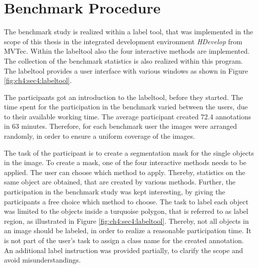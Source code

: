 
\section{Benchmark Procedure}\label{ord:ch4:sec5}
% 
The benchmark study is realized within a label tool, that was implemented in the scope of this thesis in the integrated development environment \textit{HDevelop} from MVTec.
Within the labeltool also the four interactive methods are implemented.
The collection of the benchmark statistics is also realized within this program.
The labeltool provides a user interface with various windows as shown in Figure \ref{fig:ch4:sec4:labeltool}.

The participants got an introduction to the labeltool, before they started.
The time spent for the participation in the benchmark varied between the users, due to their available working time. %
The average participant created 72.4 annotations in 63 minutes.
Therefore, for each benchmark user the images were arranged randomly, in order to ensure a uniform coverage of the images.

The task of the participant is to create a segmentation mask for the single objects in the image.
To create a mask, one of the four interactive methods needs to be applied.
The user can choose which method to apply.
Thereby, statistics on the same object are obtained, that are created by various methods.
Further, the participation in the benchmark study was kept interesting, by giving the participants a free choice which method to choose.
The task to label each object was limited to the objects inside a turquoise polygon, that is referred to as label region, as illustrated in Figure \ref{fig:ch4:sec4:labeltool}.
Thereby, not all objects in an image should be labeled, in order to realize a reasonable participation time.
It is not part of the user's task to assign a class name for the created annotation.
An additional label instruction was provided partially, to clarify the scope and avoid misunderstandings.

